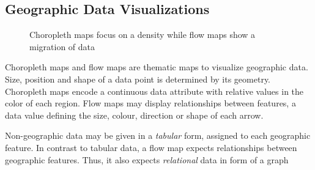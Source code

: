 \subsection{Geographic Data Visualizations}

\begin{figure}
  \centering
  \caption{Choropleth maps focus on a density while flow maps show a migration of data}%
  \label{fig:analysis:geographical}
  \qquad
\end{figure}

Choropleth maps and flow maps are thematic maps to visualize geographic data.
Size, position and shape of a data point is determined by its geometry.
Choropleth maps encode a continuous data attribute with relative values in the color of each region.
Flow maps may display relationships between features, a data value defining the size, colour, direction or shape of each arrow.

Non-geographic data may be given in a \emph{tabular} form, assigned to each geographic feature.
In contrast to tabular data, a flow map expects relationships between geographic features.
Thus, it also expects \emph{relational} data in form of a graph


